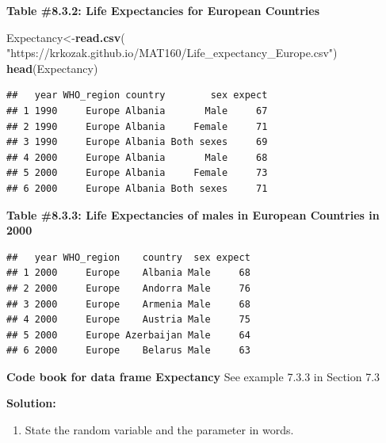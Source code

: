 \documentclass[
]{book}
\newenvironment{Shaded}{\begin{snugshade}}{\end{snugshade}}
\newcommand{\KeywordTok}[1]{\textcolor[rgb]{0.13,0.29,0.53}{\textbf{#1}}}
\newcommand{\NormalTok}[1]{#1}
\newcommand{\OperatorTok}[1]{\textcolor[rgb]{0.81,0.36,0.00}{\textbf{#1}}}
\newcommand{\StringTok}[1]{\textcolor[rgb]{0.31,0.60,0.02}{#1}}
\providecommand{\tightlist}{%
  \setlength{\itemsep}{0pt}\setlength{\parskip}{0pt}}
\begin{document}
\textbf{Table \#8.3.2: Life Expectancies for European Countries}

\begin{Shaded}
\begin{Highlighting}[]
\NormalTok{Expectancy<-}\KeywordTok{read.csv}\NormalTok{(}
  \StringTok{"https://krkozak.github.io/MAT160/Life_expectancy_Europe.csv"}\NormalTok{)}
\KeywordTok{head}\NormalTok{(Expectancy)}
\end{Highlighting}
\end{Shaded}

\begin{verbatim}
##   year WHO_region country        sex expect
## 1 1990     Europe Albania       Male     67
## 2 1990     Europe Albania     Female     71
## 3 1990     Europe Albania Both sexes     69
## 4 2000     Europe Albania       Male     68
## 5 2000     Europe Albania     Female     73
## 6 2000     Europe Albania Both sexes     71
\end{verbatim}

\textbf{Table \#8.3.3: Life Expectancies of males in European Countries in 2000}

\begin{Shaded}
\end{Shaded}

\begin{verbatim}
##   year WHO_region    country  sex expect
## 1 2000     Europe    Albania Male     68
## 2 2000     Europe    Andorra Male     76
## 3 2000     Europe    Armenia Male     68
## 4 2000     Europe    Austria Male     75
## 5 2000     Europe Azerbaijan Male     64
## 6 2000     Europe    Belarus Male     63
\end{verbatim}

\textbf{Code book for data frame Expectancy} See example 7.3.3 in Section 7.3

\textbf{Solution:}

\begin{enumerate}
\def\labelenumi{\arabic{enumi}.}
\tightlist
\item
  State the random variable and the parameter in words.
\end{enumerate}
\end{document}
